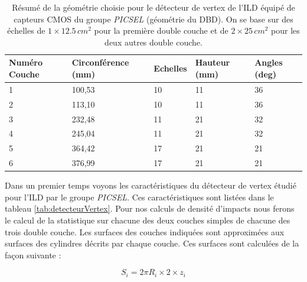   \begin{table}[h]
  \centering
  \footnotesize
    \begin{tabular}{|l|l|l|l|l|}
     \hline
     \textbf{Numéro Couche} & \textbf{Circonférence (mm)} & \textbf{Echelles} & \textbf{Hauteur (mm)} & \textbf{Angles (deg)} \\ \hline
      1                      & 100,53              & 10                & 11        & 36                             \\ \hline
      2                      & 113,10              & 10                & 11        & 36                             \\ \hline
      3                      & 232,48              & 11                & 21        & 32                             \\ \hline
      4                      & 245,04              & 11                & 21        & 32                             \\ \hline
      5                      & 364,42              & 17                & 21        & 21                             \\ \hline
      6                      & 376,99              & 17                & 21        & 21                             \\ \hline
    \end{tabular}
    \caption{R\'esum\'e de la g\'eom\'etrie choisie pour le d\'etecteur de vertex de l'ILD \'equipé de capteurs CMOS du groupe \textit{PICSEL} (g\'eom\'etrie du DBD). On se base sur des \'echelles de $1 \times 12.5 \, cm^2$ pour la premi\`ere double couche et de $2 \times 25 \,cm^2$ pour les deux autres double couche.}
   \label{tab:detecteurVertex2}
  \end{table}
  
  \medskip

  Dans un premier temps voyons les caract\'eristiques du d\'etecteur de vertex \'etudi\'e pour l'ILD par le groupe \textit{PICSEL}. Ces caract\'eristiques sont list\'ees dans le tableau \ref{tab:detecteurVertex}. Pour nos calculs de densit\'e d'impacts nous ferons le calcul de la statistique sur chacune des deux couches simples de chacune des trois double couche. Les surfaces des couches indiqu\'ees sont approxim\'ees aux surfaces des cylindres décrits par chaque couche. Ces surfaces sont calcul\'ees de la fa\c{c}on suivante :
  
  \begin{equation}
   S_i = 2 \pi R_i \times 2 \times z_i 
  \end{equation}

